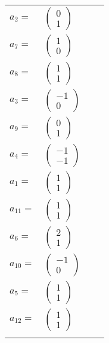 \documentclass[1p]{elsarticle_modified}
\theoremstyle{definition}
\begin{document}
\begin{tabular}{m{7pt} m{180pt} m{7pt} m{180pt} }
\flushright $a_{2}=$&$\begin{pmatrix}0\\1\end{pmatrix}$ \\
\flushright $a_{7}=$&$\begin{pmatrix}1\\0\end{pmatrix}$ \\
\flushright $a_{8}=$&$\begin{pmatrix}1\\1\end{pmatrix}$ \\
\flushright $a_{3}=$&$\begin{pmatrix}-1\\0\end{pmatrix}$ \\
\flushright $a_{9}=$&$\begin{pmatrix}0\\1\end{pmatrix}$ \\
\flushright $a_{4}=$&$\begin{pmatrix}-1\\-1\end{pmatrix}$ \\
\flushright $a_{1}=$&$\begin{pmatrix}1\\1\end{pmatrix}$ \\
\flushright $a_{11}=$&$\begin{pmatrix}1\\1\end{pmatrix}$ \\
\flushright $a_{6}=$&$\begin{pmatrix}2\\1\end{pmatrix}$ \\
\flushright $a_{10}=$&$\begin{pmatrix}-1\\0\end{pmatrix}$ \\
\flushright $a_{5}=$&$\begin{pmatrix}1\\1\end{pmatrix}$ \\
\flushright $a_{12}=$&$\begin{pmatrix}1\\1\end{pmatrix}$\\&\end{tabular}
\end{document}
